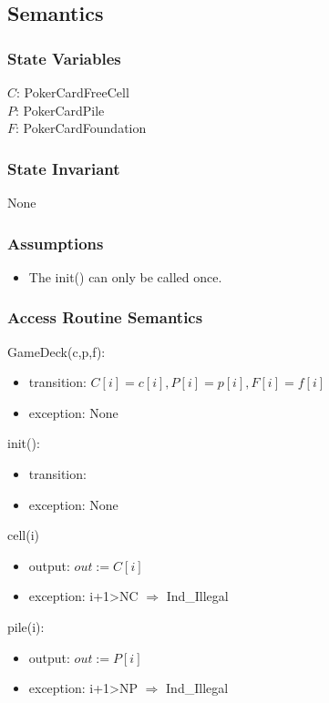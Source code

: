 \documentclass[12pt]{article}
\begin{document}
\subsection* {Semantics}

\subsubsection* {State Variables}

$C$: PokerCardFreeCell\\
$P$: PokerCardPile\\
$F$: PokerCardFoundation\\

\subsubsection* {State Invariant}

None

\subsubsection* {Assumptions}

\begin{itemize}
\item The init() can only be called once.
\end{itemize}

\subsubsection* {Access Routine Semantics}
GameDeck(c,p,f):
\begin{itemize}
\item transition: $C[i]=c[i], P[i]=p[i], F[i]=f[i]$
\item exception: None
\end{itemize}

\noindent init():
\begin{itemize}
\item transition:
\item exception: None
\end{itemize}

\noindent cell(i)
\begin{itemize}
\item output: $out := C[i]$
\item exception: i+1>NC $\Rightarrow$ Ind\_Illegal
\end{itemize}

\noindent pile(i):
\begin{itemize}
\item output: $out := P[i]$
\item exception: i+1>NP $\Rightarrow$ Ind\_Illegal
\end{itemize}
\end{document}
